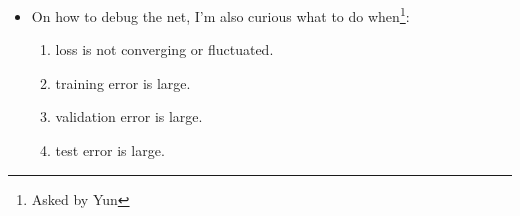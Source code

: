 \begin{itemize}
\item On how to debug the net, I'm also curious what to do when\footnote{Asked by Yun}:
\begin{enumerate}
\item loss is not converging or fluctuated. 
\item training error is large. 
\item validation error is large.
\item test error is large.
\end{enumerate}
\end{itemize}